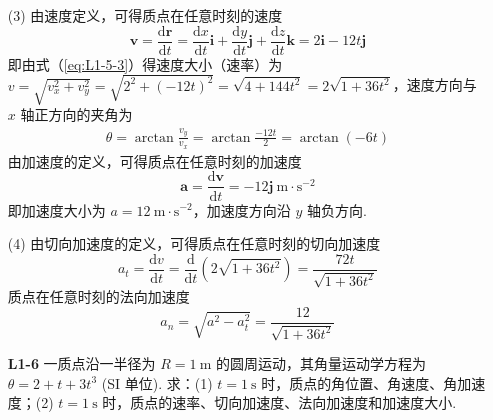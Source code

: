\begin{enumerate}
	(3) 由速度定义，可得质点在任意时刻的速度
	\begin{equation}\label{eq:L1-5-3}
		\boldsymbol{v} = \frac{\mathrm{d}\boldsymbol{r}}{\mathrm{d}t} = \frac{\mathrm{d}x}{\mathrm{d}t}\boldsymbol{i} + \frac{\mathrm{d}y}{\mathrm{d}t}\boldsymbol{j} + \frac{\mathrm{d}z}{\mathrm{d}t}\boldsymbol{k} = 2\boldsymbol{i} - 12t\boldsymbol{j}
	\end{equation}
	即由式（\ref{eq:L1-5-3}）得速度大小（速率）为 $v = \sqrt{v_x^2 + v_y^2} = \sqrt{2^2 + (-12t)^2} = \sqrt{4 + 144t^2} = 2\sqrt{1 + 36t^2}$，速度方向与 $x$ 轴正方向的夹角为
	\begin{align*}
		\theta = \arctan \frac{v_y}{v_x} = \arctan \frac{-12t}{2} = \arctan(-6t)
	\end{align*}
	由加速度的定义，可得质点在任意时刻的加速度
	\begin{equation}\label{eq:L1-5-4}
		\boldsymbol{a} = \frac{\mathrm{d}\boldsymbol{v}}{\mathrm{d}t} = -12\boldsymbol{j} \mathrm{\ m \cdot s^{-2}}
	\end{equation}
	即加速度大小为 $a = 12 \mathrm{\ m \cdot s^{-2}}$，加速度方向沿 $y$ 轴负方向.
	
	(4) 由切向加速度的定义，可得质点在任意时刻的切向加速度
	\begin{equation}\label{eq:L1-5-5}
		a_t = \frac{\mathrm{d}v}{\mathrm{d}t} = \frac{\mathrm{d}}{\mathrm{d}t}\left( 2\sqrt{1 + 36t^2} \right) = \frac{72t}{\sqrt{1 + 36t^2}}
	\end{equation}
	质点在任意时刻的法向加速度
	\begin{equation}\label{eq:L1-5-6}
		a_n = \sqrt{a^2 - a_t^2} = \frac{12}{\sqrt{1 + 36t^2}}
	\end{equation}
	
	\vspace{2em}
	
	\item [\textbf{L1-6}]
	\setcounter{equation}{0}
	\renewcommand{\theHequation}{L1-6.\arabic{equation}}
	\quad 一质点沿一半径为 $R = 1 \mathrm{\ m}$ 的圆周运动，其角量运动学方程为 $\theta = 2 + t + 3t^3$ (SI 单位). 求：(1) $t = 1 \mathrm{\ s}$ 时，质点的角位置、角速度、角加速度；(2) $t = 1 \mathrm{\ s}$ 时，质点的速率、切向加速度、法向加速度和加速度大小.
	

\end{enumerate}
